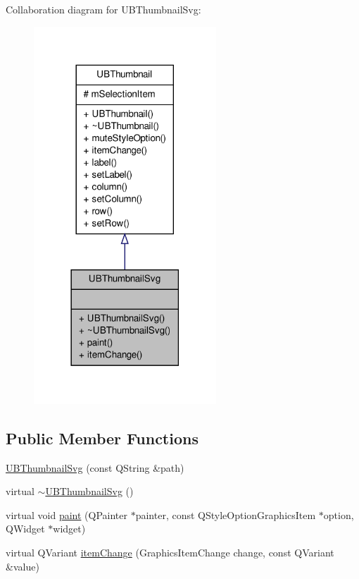 Collaboration diagram for U\-B\-Thumbnail\-Svg\-:
\nopagebreak
\begin{figure}[H]
\begin{center}
\leavevmode
\includegraphics[width=194pt]{d6/d29/class_u_b_thumbnail_svg__coll__graph}
\end{center}
\end{figure}
\subsection*{Public Member Functions}
\begin{DoxyCompactItemize}
\item 
\hyperlink{class_u_b_thumbnail_svg_a27b2eff10451cdfcc302567a348afd21}{U\-B\-Thumbnail\-Svg} (const Q\-String \&path)
\item 
virtual \hyperlink{class_u_b_thumbnail_svg_a1b9daced4bb42c808f4551b342682fb3}{$\sim$\-U\-B\-Thumbnail\-Svg} ()
\item 
virtual void \hyperlink{class_u_b_thumbnail_svg_abd17c3187118187411144d3df27afd6d}{paint} (Q\-Painter $\ast$painter, const Q\-Style\-Option\-Graphics\-Item $\ast$option, Q\-Widget $\ast$widget)
\item 
virtual Q\-Variant \hyperlink{class_u_b_thumbnail_svg_a5a8ad72222c14c3d8f2f7744b73b71cd}{item\-Change} (Graphics\-Item\-Change change, const Q\-Variant \&value)
\end{DoxyCompactItemize}
